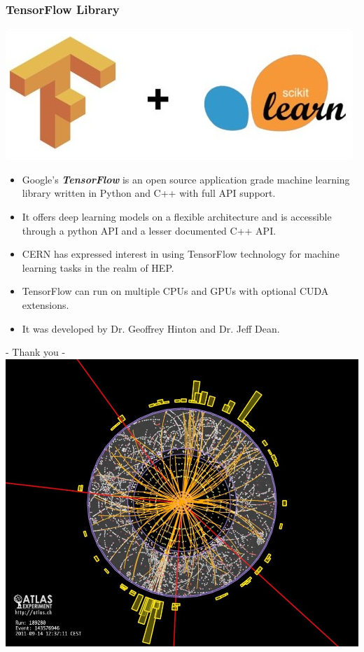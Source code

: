 \documentclass[pdf]{beamer}
\begin{document}
\begin{frame}
\frametitle{TensorFlow Library}
\begin{center}
\includegraphics[scale=0.3]{skflow.jpg}
\end{center}
\begin{itemize}
\item Google's \textbf{\textit{TensorFlow}} is an open source application grade machine learning library written in Python and C++ with full API support.
\item It offers deep learning models on a flexible architecture and is accessible through a python API and a lesser documented C++ API.   
\item CERN has expressed interest in using TensorFlow technology for machine learning tasks in the realm of HEP. 
\item TensorFlow can run on multiple CPUs and GPUs with optional CUDA extensions. 
\item It was developed by Dr. Geoffrey Hinton and Dr. Jeff Dean.
\end{itemize}
\end{frame}


\begin{frame}
\begin{center}
- Thank you -\\
\includegraphics[scale=0.2]{lhc-atlas-protons.jpg}\\
\end{center}
\end{frame}
\end{document}
